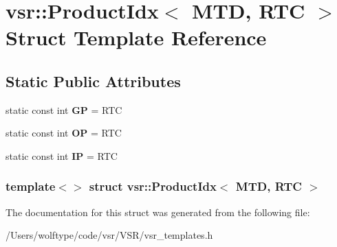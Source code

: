 \hypertarget{structvsr_1_1_product_idx_3_01_m_t_d_00_01_r_t_c_01_4}{\section{vsr\-:\-:Product\-Idx$<$ M\-T\-D, R\-T\-C $>$ Struct Template Reference}
\label{structvsr_1_1_product_idx_3_01_m_t_d_00_01_r_t_c_01_4}
}
\subsection*{Static Public Attributes}
\begin{DoxyCompactItemize}
\item 
\hypertarget{structvsr_1_1_product_idx_3_01_m_t_d_00_01_r_t_c_01_4_a61fd1c8ef44ecf9eddebdb71951bd1f4}{static const int {\bfseries G\-P} = R\-T\-C}\label{structvsr_1_1_product_idx_3_01_m_t_d_00_01_r_t_c_01_4_a61fd1c8ef44ecf9eddebdb71951bd1f4}

\item 
\hypertarget{structvsr_1_1_product_idx_3_01_m_t_d_00_01_r_t_c_01_4_a0668c345c9d4d06e6a1a89b988963629}{static const int {\bfseries O\-P} = R\-T\-C}\label{structvsr_1_1_product_idx_3_01_m_t_d_00_01_r_t_c_01_4_a0668c345c9d4d06e6a1a89b988963629}

\item 
\hypertarget{structvsr_1_1_product_idx_3_01_m_t_d_00_01_r_t_c_01_4_a96c6fe1d3c2435b8892ec3515df0d3ed}{static const int {\bfseries I\-P} = R\-T\-C}\label{structvsr_1_1_product_idx_3_01_m_t_d_00_01_r_t_c_01_4_a96c6fe1d3c2435b8892ec3515df0d3ed}

\end{DoxyCompactItemize}
\subsubsection*{template$<$$>$ struct vsr\-::\-Product\-Idx$<$ M\-T\-D, R\-T\-C $>$}



The documentation for this struct was generated from the following file\-:\begin{DoxyCompactItemize}
\item 
/\-Users/wolftype/code/vsr/\-V\-S\-R/vsr\-\_\-templates.\-h\end{DoxyCompactItemize}
